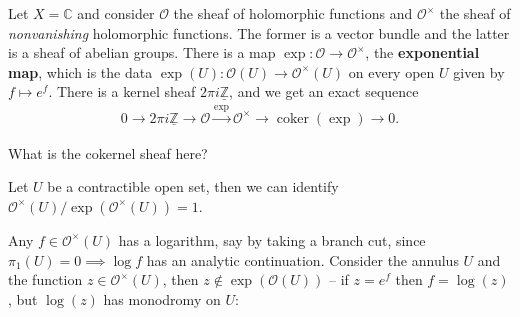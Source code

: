 Let \(X = {\mathbb{C}}\) and consider \({\mathcal{O}}\) the sheaf of
holomorphic functions and \({\mathcal{O}}^{\times}\) the sheaf of
\emph{nonvanishing} holomorphic functions. The former is a vector bundle
and the latter is a sheaf of abelian groups. There is a map
\(\exp: {\mathcal{O}}\to {\mathcal{O}}^{\times}\), the
\textbf{exponential map}, which is the data
\(\exp(U): {\mathcal{O}}(U) \to {\mathcal{O}}^{\times}(U)\) on every
open \(U\) given by \(f\mapsto e^f\). There is a kernel sheaf
\(2\pi i \underline{{\mathbb{Z}}}\), and we get an exact sequence
\begin{align*}
0 \to 2\pi i \underline{{\mathbb{Z}}} \to {\mathcal{O}}\xrightarrow{\exp} {\mathcal{O}}^{\times}\to \operatorname{coker}(\exp) \to 0
.\end{align*}

\begin{question}

What is the cokernel sheaf here?

\end{question}

Let \(U\) be a contractible open set, then we can identify
\({\mathcal{O}}^{\times}(U) / \exp({\mathcal{O}}^{\times}(U)) = 1\).

\begin{figure}
\centering
{}
\end{figure}

Any \(f\in {\mathcal{O}}^{\times}(U)\) has a logarithm, say by taking a
branch cut, since \(\pi_1(U) =0 \implies \log f\) has an analytic
continuation. Consider the annulus \(U\) and the function
\(z\in {\mathcal{O}}^{\times}(U)\), then
\(z\not\in \exp({\mathcal{O}}(U))\) -- if \(z=e^f\) then \(f=\log(z)\),
but \(\log(z)\) has monodromy on \(U\):

\begin{figure}
\centering
{}
\end{figure}


